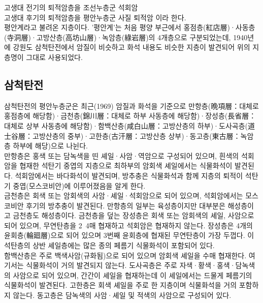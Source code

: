 \documentclass[12pt,a4paper]{book}
\begin{document}
		고생대 전기의 퇴적암층을 조선누층군 석회암\\
		고생대 후기의 퇴적암층을 평안누층군 사질 퇴적암 이라 한다.\\

		평안계라고 불려온 지층이다. 
		'평안계'는 처음 평양 부근에서 홍점층(紅店層)·사동층(寺洞層)·고방산층(高坊山層)·녹암층(綠岩層)의 4개층으로 구분되었는데, 
		1940년에 강원도 삼척탄전에서 암질이 비슷하고 화석 내용도 비슷한 지층이 발견되어 위의 지층명이 그대로 사용되었다. 

		\newpage
		\subsection{삼척탄전}
		
		삼척탄전의 평안누층군은 최근(1969) 암질과 화석을 기준으로 만항층(晩項層：대체로 홍점층에 해당함)·금천층(錦川層：대체로 하부 사동층에 해당함)·장성층(長省層：대체로 상부 사동층에 해당함)·함백산층(咸白山層：고방산층의 하부)·도사곡층(道士谷層：고방산층의 중부)·고한층(古汗層：고방산층 상부)·동고층(東古層：녹암층 하부에 해당)으로 나뉜다.\\

만항층은 홍색 또는 담녹색을 띤 셰일·사암·역암으로 구성되어 있으며, 흰색의 석회암을 협재한 석탄기 중엽의 지층으로 최하부의 암회색 셰일에서는 식물화석이 발견된다. 석회암에서는 바다화석이 발견되며, 방추충은 식물화석과 함께 지층의 퇴적이 석탄기 중엽(모스코비안)에 이루어졌음을 알게 한다.\\

 금천층은 회색 또는 암회색의 사암·셰일·석회암으로 되어 있으며, 석회암에서는 모스코비안 후기의 방추충이 발견된다. 만항층의 일부는 육성층이지만 대부분은 해성층이고 금천층도 해성층이다. 금천층을 덮는 장성층은 회색 또는 암회색의 셰일, 사암으로 되어 있으며, 무연탄층을 2~4매 협재하고 석회암은 협재하지 않는다. 장성층은 4개의 윤회층(輪廻層)으로 되어 있으며 3번째 윤회층에 협재된 무연탄층이 가장 두껍다. 이 석탄층의 상반 셰일층에는 많은 종의 페름기 식물화석이 포함되어 있다. \\
 
 함백산층은 주로 백색사암(규화됨)으로 되어 있으며 암회색 셰일을 수매 협재한다. 여기서는 식물화석이 거의 발견되지 않는다. 도사곡층은 주로 자색·황색·홍색·담녹색의 사암으로 되어 있으며, 간간이 셰일을 협재하는데 이 셰일에서는 드물게 페름기의 식물화석이 발견된다. 고한층은 회색 셰일을 주로 한 지층이며 식물화석을 거의 포함하지 않는다. 동고층은 담녹색의 사암·셰일 및 적색의 사암으로 구성되어 있다.\\
\end{document}
